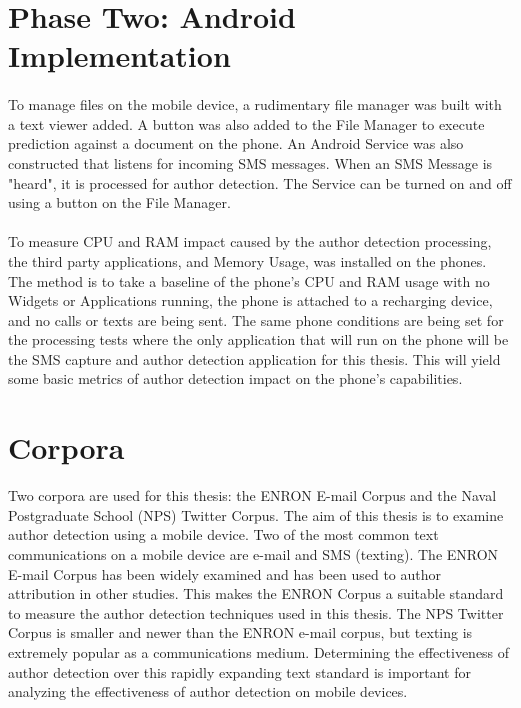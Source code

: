 
\section{Phase Two: Android Implementation}
	\paragraph{}To manage files on the mobile device, a rudimentary file manager was built with a text viewer added.  A button was also added to the File Manager to execute prediction against a document on the phone.  An Android Service was also constructed that listens for incoming SMS messages.  When an SMS Message is "heard", it is processed for author detection.  The Service can be turned on and off using a button on the File Manager.  
	\paragraph{}To measure CPU and RAM impact caused by the author detection processing, the third party applications, and Memory Usage, was installed on the phones.  The method is to take a baseline of the phone's CPU and RAM usage with no Widgets or Applications running, the phone is attached to a recharging device, and no calls or texts are being sent.  The same phone conditions are being set for the processing tests where the only application that will run on the phone will be the SMS capture and author detection application for this thesis.  This will yield some basic metrics of author detection impact on the phone's capabilities.

\section{Corpora} Two corpora are used for this thesis: the ENRON E-mail Corpus and the Naval Postgraduate School (NPS) Twitter Corpus.  The aim of this thesis is to examine author detection using a mobile device.  Two of the most common text communications on a mobile device are e-mail and SMS (texting).  The ENRON E-mail Corpus has been widely examined and has been used to author attribution in other studies.  This makes the ENRON Corpus a suitable standard to measure the author detection techniques used in this thesis.  The NPS Twitter Corpus is smaller and newer than the ENRON e-mail corpus, but texting is extremely popular as a communications medium.  Determining the effectiveness of author detection over this rapidly expanding text standard is important for analyzing the effectiveness of author detection on mobile devices.
